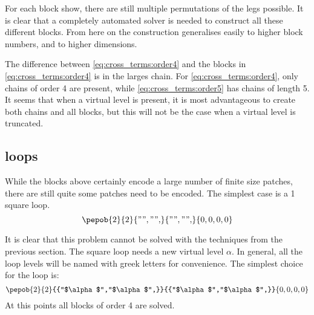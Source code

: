 For each block show, there are still multiple permutations of the legs possible. It is clear that a completely automated solver is needed to construct all these different blocks. From here on the construction generalises easily to higher block numbers, and to higher dimensions.

The difference between \cref{eq:cross_terms:order4} and the blocks in \cref{eq:cross_terms:order4} is in the larges chain. For \cref{eq:cross_terms:order4}, only chains of order 4 are present, while  \cref{eq:cross_terms:order5} has chains of length 5. It seems that when a virtual level is present, it is most advantageous to create both chains and all blocks, but this will not be the case when a virtual level is truncated.

\subsection{loops}

While the blocks above certainly encode a large number of finite size patches, there are still quite some patches need to be encoded. The simplest case is a 1 square loop.
\begin{equation}
  {\pepob{2}{2}{{"","",}}{{"","",}}{{0,0,0,0}}}
\end{equation}

It is clear that this problem cannot be solved with the techniques from the previous section. The square loop needs a new virtual level $\alpha$. In general, all the loop levels will be named with greek letters for convenience. The simplest choice for the loop is:
\begin{equation}\label{tikzfig:plaquetter}
  {\pepob{2}{2}{{"$\alpha$","$\alpha$",}}{{"$\alpha$","$\alpha$",}}{{0,0,0,0}}}
\end{equation}
At this points all blocks of order 4 are solved.

